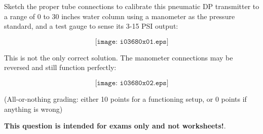 

Sketch the proper tube connections to calibrate this pneumatic DP transmitter to a range of 0 to 30 inches water column using a manometer as the pressure standard, and a test gauge to sense its 3-15 PSI output:

$$\texttt{[image: i03680x01.eps]}$$







This is not the only correct solution.  The manometer connections may be reversed and still function perfectly:

$$\texttt{[image: i03680x02.eps]}$$

(All-or-nothing grading: either 10 points for a functioning setup, or 0 points if anything is wrong)







{\bf This question is intended for exams only and not worksheets!}.


